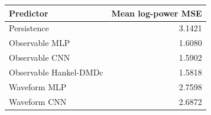 \begin{tabular}{@{}lr@{}}
\toprule
Predictor & Mean log-power MSE \\
\midrule
Persistence & 3.1421 \\
Observable MLP & 1.6080 \\
Observable CNN & 1.5902 \\
Observable Hankel-DMDc & 1.5818 \\
Waveform MLP & 2.7598 \\
Waveform CNN & 2.6872 \\
\bottomrule
\end{tabular}
